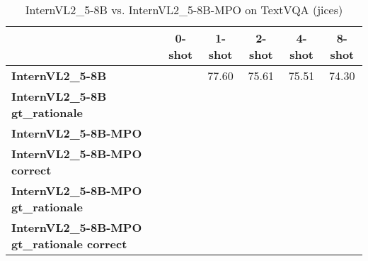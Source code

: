 \begin{table}
\caption{InternVL2\_5-8B vs. InternVL2\_5-8B-MPO on TextVQA (jices)}
\label{tab:InternVL2_5-8B_TextVQA_TRAIN_jices}
\begin{tabular}{lccccc}
\toprule
 & 0-shot & 1-shot & 2-shot & 4-shot & 8-shot \\
\midrule
\textbf{InternVL2\_5-8B} &  & 77.60 & 75.61 & 75.51 & 74.30 \\
\textbf{InternVL2\_5-8B gt\_rationale} &  &  &  &  &  \\
\textbf{InternVL2\_5-8B-MPO} &  &  &  &  &  \\
\textbf{InternVL2\_5-8B-MPO correct} &  &  &  &  &  \\
\textbf{InternVL2\_5-8B-MPO gt\_rationale} &  &  &  &  &  \\
\textbf{InternVL2\_5-8B-MPO gt\_rationale correct} &  &  &  &  &  \\
\bottomrule
\end{tabular}
\end{table}

